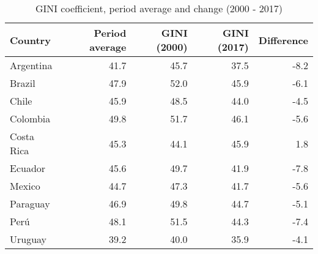\begin{table}[!h]
\begin{center}
\caption{GINI coefficient, period average and change (2000 - 2017)} \label{table:GINI_summary}
\begin{tabular}{l r r r r}     \\ \toprule
  Country    & Period average & GINI (2000) & GINI (2017) & Difference  \\ \midrule 
  Argentina  &           41.7 &        45.7 &        37.5 &        -8.2 \\
  Brazil     &           47.9 &        52.0 &        45.9 &        -6.1 \\
  Chile      &           45.9 &        48.5 &        44.0 &        -4.5 \\
  Colombia   &           49.8 &        51.7 &        46.1 &        -5.6 \\
  Costa Rica &           45.3 &        44.1 &        45.9 &         1.8 \\
  Ecuador    &           45.6 &        49.7 &        41.9 &        -7.8 \\
  Mexico     &           44.7 &        47.3 &        41.7 &        -5.6 \\
  Paraguay   &           46.9 &        49.8 &        44.7 &        -5.1 \\
  Perú       &           48.1 &        51.5 &        44.3 &        -7.4 \\
  Uruguay    &           39.2 &        40.0 &        35.9 &        -4.1 \\
  \bottomrule 
\end{tabular}
\end{center}
\end{table}